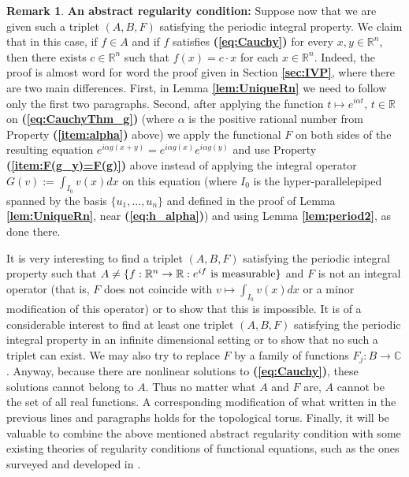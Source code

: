 \documentclass[12 pt]{amsart}
\theoremstyle{definition}
\newtheorem{remark}[thm]{Remark}
\newcommand{\R}{\mathbb{R}}
\newcommand{\C}{\mathbb{C}}
\newcommand{\bref}[1]{\textbf{\ref{#1}}} %
\newcommand{\beqref}[1]{\textbf{(\ref{#1})}} %
\begin{document}
\begin{remark}{\bf An abstract regularity condition:}
Suppose now that we are given such a triplet $(A,B,F)$ satisfying the periodic integral property. We claim that in this case, if $f\in A$ and if $f$ satisfies \beqref{eq:Cauchy} for every $x,y\in\R^n$, then there exists $c\in\R^n$ such that  $f(x)=c\cdot x$ for each $x\in\R^n$. Indeed, the proof is almost word for word the proof given in Section \bref{sec:IVP}, where there are two main differences. First, in Lemma \bref{lem:UniqueRn} we need to follow only the first two paragraphs. Second,   after applying the function $t\mapsto e^{i\alpha t}$, $t\in\R$ on \beqref{eq:CauchyThm_g} (where $\alpha$ is the positive rational number from Property \beqref{item:alpha} above) we apply the functional $F$ on  both sides of the resulting equation $e^{i\alpha g(x+y)}=e^{i\alpha g(x)}e^{i\alpha g(y)}$  and use Property \beqref{item:F(g_y)=F(g)} above instead of applying the integral operator  $G(v):=\int_{I_0} v(x)dx$ on this equation (where $I_0$ is the hyper-parallelepiped spanned by the basis $\{u_1,\ldots,u_n\}$ and  defined in the proof of Lemma \bref{lem:UniqueRn}, near \beqref{eq:h_alpha}) and using Lemma \bref{lem:period2}, as done there.  

It is very interesting to find a triplet $(A,B,F)$ satisfying the periodic integral property such that  $A\neq \{f:\R^n\to\R: e^{if}\,\,\textnormal{is  measurable}\}$ and $F$ is not an integral operator (that is, $F$ does not coincide with $v\mapsto\int_{I_0} v(x)dx$ or a minor modification of this operator) or to show that this is impossible. It is of a considerable interest to find at least one triplet $(A,B,F)$  satisfying the periodic integral property in an infinite dimensional setting or to show that no such a triplet can exist. We may also try to replace $F$ by a family of functions $F_j:B\to \C$. Anyway, because there are nonlinear solutions to \beqref{eq:Cauchy}, these solutions cannot belong to $A$. Thus no matter what $A$ and $F$ are, $A$ cannot be the set of all real functions. A corresponding modification of what written in the previous lines and paragraphs holds for the topological torus.  Finally, it will be valuable to combine the above mentioned abstract regularity condition with  some existing theories of regularity conditions of functional equations, such as the 
ones surveyed and developed in  \cite{Jarai,JaraiSzekelyhidi1996jour}.
\end{remark}
\end{document}

